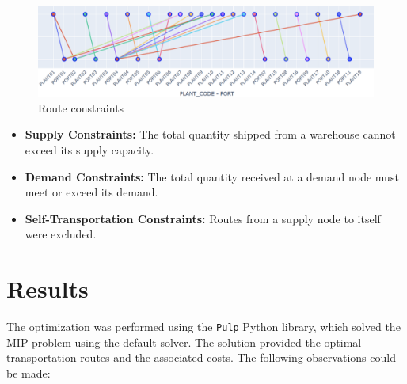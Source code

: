 \documentclass{article}
\begin{document}
\begin{figure}[!h]
     \begin{center}
     \includegraphics[width=0.6\paperwidth]{route.png}
          \end{center}
     \caption{Route constraints}
     \label{fig:cd}
\end{figure}


\begin{itemize}
    \item \textbf{Supply Constraints:} The total quantity shipped from a warehouse cannot exceed its supply capacity.
    \item \textbf{Demand Constraints:} The total quantity received at a demand node must meet or exceed its demand.
    \item \textbf{Self-Transportation Constraints:} Routes from a supply node to itself were excluded.
\end{itemize}

\section{Results}



The optimization was performed using the \texttt{Pulp} Python library, which solved the MIP problem using the default solver. The solution provided the optimal transportation routes and the associated costs. The following observations could be made:
\end{document}
